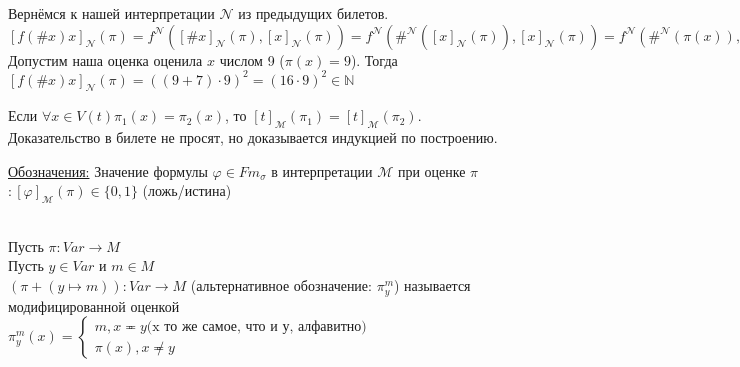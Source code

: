\documentclass[a4paper, fleqn]{article}
\begin{document}
    \begin{example}
        Вернёмся к нашей интерпретации $\mathcal{N}$ из предыдущих билетов. \\[9.5pt]
        $[f(\#  x)x]_{\mathcal{N}}(\pi) =
        f^{\mathcal{N}}([\# x]_{\mathcal{N}}(\pi), 
        [x]_{\mathcal{N}}(\pi)) =
        f^{\mathcal{N}}(\#^{\mathcal{N}}([x]_{\mathcal{N}}(\pi)), 
        [x]_{\mathcal{N}}(\pi)) =
        f^{\mathcal{N}}(\#^{\mathcal{N}}(\pi(x)), \pi(x))$ \\[9.5pt]
        Допустим наша оценка оценила $x$ числом 9 ($\pi(x) = 9$). Тогда 
        $[f(\#  x)x]_{\mathcal{N}}(\pi) = ((9 + 7) \cdot 9)^2 = (16 \cdot 9)^2 ∈ \mathbb{N}$
    \end{example}
    \begin{lemma}
        Если $∀ x ∈ V(t) \pi_1(x) = \pi_2(x)$, то 
        $[t]_{\mathcal{M}}(\pi_1) = [t]_{\mathcal{M}}(\pi_2)$. \\
        Доказательство в билете не просят,
         но доказывается индукцией по построению.
    \end{lemma}
    \underline{Обозначения:} Значение формулы $\varphi ∈ Fm_{\sigma}$ в интерпретации
    $\mathcal{M}$ при оценке $\pi$ $: [\varphi]_{\mathcal{M}}(\pi) ∈ \{0, 1\}$ (ложь/истина) \\
    \begin{definition} \ \\
        Пусть $\pi: Var → M$ \\
        Пусть $y ∈ Var$ и $m ∈ M$ \\
        $(\pi+(y ↦ m)): Var → M$ (альтернативное обозначение: 
        $\pi_y^m$) называется модифицированной оценкой\\
        $\pi_y^m(x) = \begin{cases}
            m , x \eqcirc y \text{(x то же самое, что и у, алфавитно)} \\
            \pi(x), x \not \eqcirc y
        \end{cases}$ 
    \end{definition}
\end{document}
